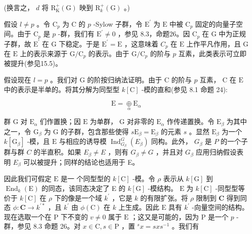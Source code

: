 \documentclass[10pt]{article}
\begin{document}
(换言之， \(d\) 将 \({\mathrm{R}}_{\mathrm{K}}^{ + }\left( \mathrm{G}\right)\) 映到 \({\mathrm{R}}_{k}^{ + }\left( \mathrm{G}\right)\) 。)

假设 \(l \neq  p\) 。令 \({\mathrm{C}}_{p}\) 为 \(\mathrm{C}\) 的 \(p\) -Sylow 子群，令 \({\mathrm{E}}^{\prime }\) 为 \(\mathrm{E}\) 中被 \({\mathrm{C}}_{p}\) 固定的向量子空间。由于 \({\mathrm{C}}_{p}\) 是 \(p\) -群，我们有 \({\mathrm{E}}^{\prime } \neq  0\) ，参见 8.3，命题26。因 \({\mathrm{C}}_{p}\) 在 \(\mathrm{G}\) 中为正规子群，故 \({\mathrm{E}}^{\prime }\) 在 \(\mathrm{G}\) 下稳定。于是 \({\mathrm{E}}^{\prime } = \mathrm{E}\) ，这意味着 \({C}_{p}\) 在 \(\mathrm{E}\) 上作平凡作用，且 \(\mathrm{G}\) 在 \(\mathrm{E}\) 上的表示来源于 \(\mathrm{G}/{\mathrm{C}}_{p}\) 的表示。由于 \(\mathrm{G}/{\mathrm{C}}_{p}\) 的阶与 \(p\) 互素，此类表示可立即被提升(参见15.5)。

假设现在 \(l = p\) 。我们对 \(\mathrm{G}\) 的阶按归纳法证明。由于 \(\mathrm{C}\) 的阶与 \(p\) 互素， \(\mathrm{C}\) 在 \(\mathrm{E}\) 中的表示是半单的。将其分解为同型型 \(k\left\lbrack  \mathrm{C}\right\rbrack\) -模的直和(参见 8.1 命题 24):

\[
\mathrm{E} = \underset{\alpha }{ \oplus  }{\mathrm{E}}_{\alpha }
\]

群 \(\mathrm{G}\) 对 \({\mathrm{E}}_{\alpha }\) 们作置换；因 \(\mathrm{E}\) 为单群， \(\mathrm{G}\) 对非零的 \({\mathrm{E}}_{\alpha }\) 作传递置换。令 \({\mathrm{E}}_{\beta }\) 为其中之一，令 \({\mathrm{G}}_{\beta }\) 为 \(\mathrm{G}\) 的子群，包含那些使得 \(s{\mathrm{E}}_{\beta } = {\mathrm{E}}_{\beta }\) 的元素 \(s\) 。显然 \({\mathrm{E}}_{\beta }\) 为一个 \(k\left\lbrack  {\mathrm{G}}_{\beta }\right\rbrack\) -模，且 \(\mathrm{E}\) 与相应的诱导模 \({\operatorname{Ind}}_{{G}_{\beta }}^{G}\left( {E}_{\beta }\right)\) 同构。此外， \({G}_{\beta }\) 是 \(P\) 的一个子群与群 \(C\) 的半直积。如果 \({E}_{\beta } \neq  E\) ，则有 \({G}_{\beta } \neq  G\) ，并且对 \({G}_{\beta }\) 应用归纳假设表明 \({E}_{\beta }\) 可以被提升；同样的结论也适用于 E。

因此我们可假定 \(\mathrm{E}\) 是一 个同型型的 \(k\left\lbrack  \mathrm{C}\right\rbrack\) -模。令 \(\rho\) 表示从 \(k\left\lbrack  \mathrm{G}\right\rbrack\) 到 \({\operatorname{End}}_{k}\left( \mathrm{E}\right)\) 的同态，该同态决定了 E 的 \(k\left\lbrack  \mathrm{G}\right\rbrack\) -模结构。 \(\mathrm{E}\) 为 \(k\left\lbrack  \mathrm{C}\right\rbrack\) -同型型等价于 \(k\left\lbrack  \mathrm{C}\right\rbrack\) 在 \(\rho\) 下的像是一个域 \({k}^{\prime }\) ，它是 \(k\) 的有限扩张。将 \(\rho\) 限制到 \(\mathbf{C}\) 得到同态 \(\phi  : \mathbf{C} \rightarrow  {k}^{\prime  * }\) ，且 \({k}^{\prime }\) 由 \(\phi \left( \mathrm{C}\right)\) 在 \(k\) 上生成。因此 \(\mathrm{E}\) 具有 \({k}^{\prime }\) -向量空间的结构。现在选取一个在 \(\mathrm{P}\) 下不变的 \(v \neq  0\) 属于 \(\mathrm{E}\) ；这又是可能的，因为 \(\mathrm{P}\) 是一个 \(p\) -群，参见 8.3 命题 26。对 \(x \in  \mathrm{C},s \in  \mathrm{P}\) ，置 \({}^{s}x = {sx}{s}^{-1}\) 。我们有
\end{document}
